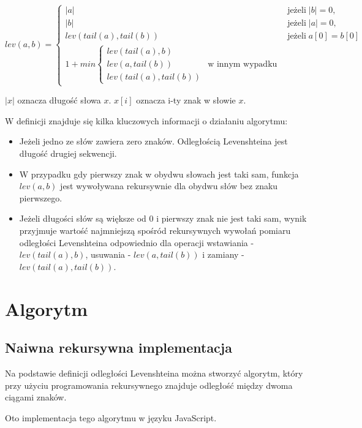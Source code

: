 \documentclass[a4paper,12pt]{article}
\begin{document}
\begin{equation*}
    lev(a,b) = \begin{cases}
        |a| & \text{jeżeli} \; |b| = 0,\\
        |b|  & \text{jeżeli} \; |a| = 0,\\
        lev(tail(a), tail(b)) & \text{jeżeli} \; a[0] = b[0]\\
        1 + min \begin{cases}
            lev(tail(a), b)\\
            lev(a, tail(b)) & \text{w innym wypadku}\\
            lev(tail(a), tail(b))
        \end{cases}
    \end{cases}
\end{equation*}

\( |x| \) oznacza długość słowa \( x \). \( x[i] \) oznacza i-ty znak
w słowie \( x \).

W definicji znajduje się kilka kluczowych informacji o działaniu
algorytmu:
\begin{itemize}
    \item Jeżeli jedno ze słów zawiera zero znaków. Odległością Levenshteina jest długość drugiej sekwencji.
    \item W przypadku gdy pierwszy znak w obydwu słowach jest taki sam,
          funkcja \( lev(a,b) \) jest wywoływana rekursywnie dla obydwu słów
          bez znaku pierwszego.
    \item Jeżeli długości słów są większe od 0 i pierwszy znak nie jest
          taki sam, wynik przyjmuje wartość najmniejszą spośród rekursywnych
          wywołań pomiaru odległości Levenshteina odpowiednio dla operacji
          wstawiania - \( lev(tail(a), b) \), usuwania - \( lev(a, tail(b)) \)
          i zamiany - \( lev(tail(a), tail(b)) \).
\end{itemize}

\section{Algorytm}
\subsection{Naiwna rekursywna implementacja}
Na podstawie definicji odległości Levenshteina można stworzyć
algorytm, który przy użyciu programowania rekursywnego znajduje
odległość między dwoma ciągami znaków.

Oto implementacja tego algorytmu w języku JavaScript.
\end{document}
